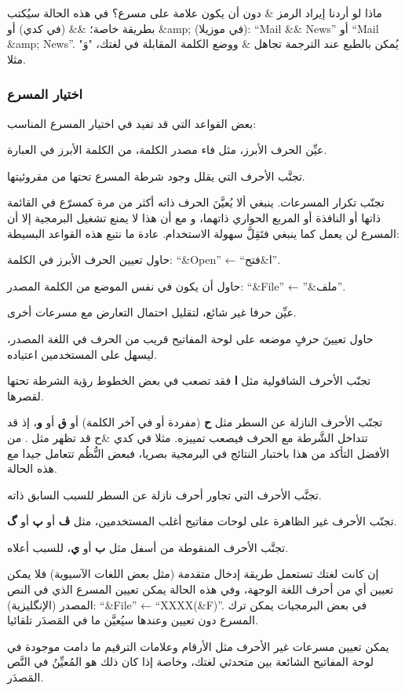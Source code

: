 ماذا لو أردنا إيراد الرمز \& دون أن يكون علامة على مسرع؟ في هذه الحالة
سيُكتب بطريقة خاصة؛ \&\& (في كدي) أو ‪\&amp;‬ (في موزيلا): “Mail \&\&
News” أو “Mail \&amp; News”. يُمكن بالطبع عند الترجمة تجاهل \& ووضع
الكلمة المقابلة في لغتك، "وَ" مثلا.

\subsubsection{اختيار المسرع}
بعض القواعد التي قد تفيد في اختيار المسرع المناسب:

\startitemize[n]
\item عيِّن الحرف الأبرز، مثل فاء مصدر الكلمة، من الكلمة الأبرز في
العبارة.
\item تجنَّب الأحرف التي يقلل وجود شرطة المسرع تحتها من مقروئيتها.
\item تجنّب تكرار المسرعات. ينبغي ألا يُعيَّنَ الحرف ذاته أكثر من مرة
كمسرّع في القائمة ذاتها أو النافذة أو المربع الحواري ذاتهما، و مع أن
هذا لا يمنع تشغيل البرمجية إلا أن المسرع لن يعمل كما ينبغي فتَقِلَّ
سهولة الاستخدام.
\stopitemize
عادة ما نتبع هذه القواعد البسيطة:

\startitemize[n]
\item حاول تعيين الحرف الأبرز في الكلمة: ‪“\&Open”‬ ← “ا\&فتح”.
\item حاول أن يكون في نفس الموضع من الكلمة المصدر: ‪“\&File”‬ ← ”\&ملف”.
\item عيِّن حرفا غير شائع، لتقليل احتمال التعارض مع مسرعات أخرى.
\item حاول تعيينَ حرفٍ موضعه على لوحة المفاتيح قريب من الحرف في اللغة
المصدر، ليسهل على المستخدمين اعتياده.
\item تجنّب الأحرف الشاقولية مثل {\bf ا} فقد تصعب في بعض الخطوط رؤية
الشرطة تحتها لقصرها.
\item تجنّب الأحرف النازلة عن السطر مثل {\bf ح} (مفردة أو في آخر الكلمة)
أو {\bf ق} أو {\bf و}، إذ قد تتداخل الشَّرطة مع الحرف فيصعب تمييزه.
مثلا في كدي \&ح قد تظهر مثل . من الأفضل التأكد من هذا
باختبار النتائج في البرمجية بصريا، فبعض النُّظُم تتعامل جيدا مع هذه
الحالة.
\item تجنَّب الأحرف التي تجاور أحرف نازلة عن السطر للسبب السابق ذاته.
\item تجنّب الأحرف غير الظاهرة على لوحات مفاتيح أغلب المستخدمين، مثل
{\bf ڤ} أو {\bf پ} أو {\bf گ}.
\item تجنَّب الأحرف المنقوطة من أسفل مثل {\bf ب} أو {\bf ي}، للسبب
أعلاه.
\item إن كانت لغتك تستعمل طريقة إدخال متقدمة (مثل بعض اللغات الآسيوية)
فلا يمكن تعيين أي من أحرف اللغة الوجهة، وفي هذه الحالة يمكن تعيين
المسرع الذي في النص المصدر (الإنگليزية): ‪“\&File”‬ ←‏ ‪“XXXX(\&F)”‬.
في بعض البرمجيات يمكن ترك المسرع دون تعيين وعندها سيُعيَّن ما في
المَصدَر تلقائيا.
\item يمكن تعيين مسرعات غير الأحرف مثل الأرقام وعلامات الترقيم ما دامت
موجودة في لوحة المفاتيح الشائعة بين متحدثي لغتك، وخاصة إذا كان ذلك هو
المُعيِّنُ في النَّص المَصدَر.
\stopitemize
